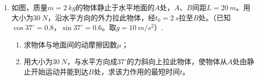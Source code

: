 \begin{enumerate}[leftmargin=0em]
\begin{enumerate}
\end{enumerate}
\begin{figure}[h!]
\flushright

\end{figure}





\item 
{}
如图，质量$ m=2 \ kg $的物体静止于水平地面的$ A $处，$ A $、$ B $间距$ L=20\ m $。用大小为$ 30 \ N $，沿水平方向的外力拉此物体，经$ t_0=2\ s $拉至$ B $处。（已知$ \cos 37 ^{\circ} =0.8 $，$ \sin 37 ^{\circ} =0.6 $。取$ g=10 \ m/s^{2} $）.
\begin{enumerate}
\renewcommand{\labelenumi}{\arabic{enumi}.}
\item
求物体与地面间的动摩擦因数$ \mu $；
\item 
用大小为$ 30 \ N $，与水平方向成$ 37 ^{ \circ } $的力斜向上拉此物体，使物体从$ A $处由静止开始运动并能到达$ B $处，求该力作用的最短时间$ t $。


\end{enumerate}
\begin{figure}[h!]
\flushright

\end{figure}

\end{enumerate}
